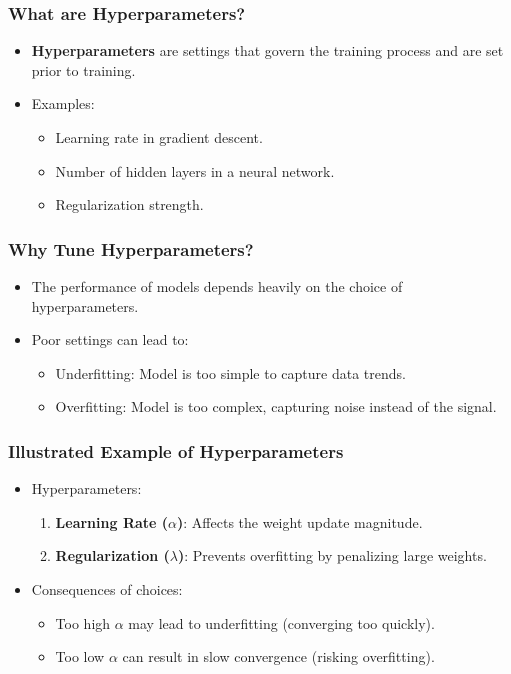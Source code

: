 \documentclass[aspectratio=169]{beamer}
\begin{document}
\begin{frame}[fragile]
    \frametitle{What are Hyperparameters?}
    \begin{itemize}
        \item \textbf{Hyperparameters} are settings that govern the training process and are set prior to training.
        \item Examples:
            \begin{itemize}
                \item Learning rate in gradient descent.
                \item Number of hidden layers in a neural network.
                \item Regularization strength.
            \end{itemize}
    \end{itemize}
\end{frame}

\begin{frame}[fragile]
    \frametitle{Why Tune Hyperparameters?}
    \begin{itemize}
        \item The performance of models depends heavily on the choice of hyperparameters.
        \item Poor settings can lead to:
            \begin{itemize}
                \item Underfitting: Model is too simple to capture data trends.
                \item Overfitting: Model is too complex, capturing noise instead of the signal.
            \end{itemize}
    \end{itemize}
\end{frame}

\begin{frame}[fragile]
    \frametitle{Illustrated Example of Hyperparameters}
    \begin{itemize}
        \item Hyperparameters:
            \begin{enumerate}
                \item \textbf{Learning Rate ($\alpha$)}: Affects the weight update magnitude.
                \item \textbf{Regularization ($\lambda$)}: Prevents overfitting by penalizing large weights.
            \end{enumerate}
        \item Consequences of choices:
            \begin{itemize}
                \item Too high $\alpha$ may lead to underfitting (converging too quickly).
                \item Too low $\alpha$ can result in slow convergence (risking overfitting).
            \end{itemize}
    \end{itemize}
\end{frame}
\end{document}
